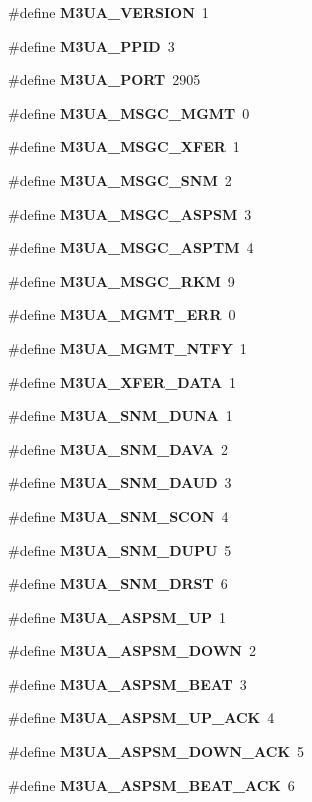 \begin{DoxyCompactItemize}
\item 
\#define {\bf M3\+U\+A\+\_\+\+V\+E\+R\+S\+I\+ON}~1
\item 
\#define {\bf M3\+U\+A\+\_\+\+P\+P\+ID}~3
\item 
\#define {\bf M3\+U\+A\+\_\+\+P\+O\+RT}~2905
\item 
\#define {\bf M3\+U\+A\+\_\+\+M\+S\+G\+C\+\_\+\+M\+G\+MT}~0
\item 
\#define {\bf M3\+U\+A\+\_\+\+M\+S\+G\+C\+\_\+\+X\+F\+ER}~1
\item 
\#define {\bf M3\+U\+A\+\_\+\+M\+S\+G\+C\+\_\+\+S\+NM}~2
\item 
\#define {\bf M3\+U\+A\+\_\+\+M\+S\+G\+C\+\_\+\+A\+S\+P\+SM}~3
\item 
\#define {\bf M3\+U\+A\+\_\+\+M\+S\+G\+C\+\_\+\+A\+S\+P\+TM}~4
\item 
\#define {\bf M3\+U\+A\+\_\+\+M\+S\+G\+C\+\_\+\+R\+KM}~9
\item 
\#define {\bf M3\+U\+A\+\_\+\+M\+G\+M\+T\+\_\+\+E\+RR}~0
\item 
\#define {\bf M3\+U\+A\+\_\+\+M\+G\+M\+T\+\_\+\+N\+T\+FY}~1
\item 
\#define {\bf M3\+U\+A\+\_\+\+X\+F\+E\+R\+\_\+\+D\+A\+TA}~1
\item 
\#define {\bf M3\+U\+A\+\_\+\+S\+N\+M\+\_\+\+D\+U\+NA}~1
\item 
\#define {\bf M3\+U\+A\+\_\+\+S\+N\+M\+\_\+\+D\+A\+VA}~2
\item 
\#define {\bf M3\+U\+A\+\_\+\+S\+N\+M\+\_\+\+D\+A\+UD}~3
\item 
\#define {\bf M3\+U\+A\+\_\+\+S\+N\+M\+\_\+\+S\+C\+ON}~4
\item 
\#define {\bf M3\+U\+A\+\_\+\+S\+N\+M\+\_\+\+D\+U\+PU}~5
\item 
\#define {\bf M3\+U\+A\+\_\+\+S\+N\+M\+\_\+\+D\+R\+ST}~6
\item 
\#define {\bf M3\+U\+A\+\_\+\+A\+S\+P\+S\+M\+\_\+\+UP}~1
\item 
\#define {\bf M3\+U\+A\+\_\+\+A\+S\+P\+S\+M\+\_\+\+D\+O\+WN}~2
\item 
\#define {\bf M3\+U\+A\+\_\+\+A\+S\+P\+S\+M\+\_\+\+B\+E\+AT}~3
\item 
\#define {\bf M3\+U\+A\+\_\+\+A\+S\+P\+S\+M\+\_\+\+U\+P\+\_\+\+A\+CK}~4
\item 
\#define {\bf M3\+U\+A\+\_\+\+A\+S\+P\+S\+M\+\_\+\+D\+O\+W\+N\+\_\+\+A\+CK}~5
\item 
\#define {\bf M3\+U\+A\+\_\+\+A\+S\+P\+S\+M\+\_\+\+B\+E\+A\+T\+\_\+\+A\+CK}~6

\end{DoxyCompactItemize}
